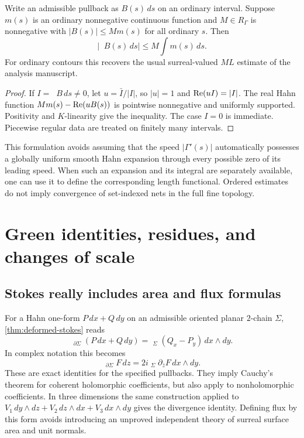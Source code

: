 \documentclass[11pt,letterpaper]{article}
\theoremstyle{definition}
\theoremstyle{remark}
\newcommand{\HInt}{\mathop{\int^{\!H}}\nolimits}\newcommand{\HCoint}{\mathop{\oint^{\!H}}\nolimits}
\numberwithin{equation}{section}
\begin{document}
\begin{proposition}\label{prop:ML}
Write an admissible pullback as $B(s)\,ds$ on an ordinary interval. Suppose $m(s)$ is an ordinary nonnegative continuous function and $M\in R_\Gamma$ is nonnegative with $|B(s)|\le M m(s)$ for all ordinary $s$. Then
\[
 \left|\HInt B(s)\,ds\right|\le M\int m(s)\,ds.
\]
For ordinary contours this recovers the usual surreal-valued $ML$ estimate of the analysis manuscript.
\end{proposition}
\begin{proof}
If $I=\HInt B\,ds\ne0$, let $u=\bar I/|I|$, so $|u|=1$ and $\operatorname{Re}(uI)=|I|$. The real Hahn function $Mm(s)-\operatorname{Re}(uB(s))$ is pointwise nonnegative and uniformly supported. Positivity and $K$-linearity give the inequality. The case $I=0$ is immediate. Piecewise regular data are treated on finitely many intervals.
\end{proof}

This formulation avoids assuming that the speed $|\Gamma'(s)|$ automatically possesses a globally uniform smooth Hahn expansion through every possible zero of its leading speed. When such an expansion and its integral are separately available, one can use it to define the corresponding length functional. Ordered estimates do not imply convergence of set-indexed nets in the full fine topology.

\section{Green identities, residues, and changes of scale}\label{sec:residues}
\subsection{Stokes really includes area and flux formulas}
For a Hahn one-form $P\,dx+Q\,dy$ on an admissible oriented planar $2$-chain $\Sigma$, \cref{thm:deformed-stokes} reads
\begin{equation}\label{eq:green}
 \HInt_{\partial\Sigma}(P\,dx+Q\,dy)
 =\HInt_\Sigma(Q_x-P_y)\,dx\wedge dy.
\end{equation}
In complex notation this becomes
\begin{equation}\label{eq:cauchygreen}
 \HInt_{\partial\Sigma}F\,dz
 =2i\HInt_\Sigma\partial_{\bar z}F\,dx\wedge dy.
\end{equation}
These are exact identities for the specified pullbacks. They imply Cauchy's theorem for coherent holomorphic coefficients, but also apply to nonholomorphic coefficients. In three dimensions the same construction applied to
$V_1\,dy\wedge dz+V_2\,dz\wedge dx+V_3\,dx\wedge dy$
gives the divergence identity. Defining flux by this form avoids introducing an unproved independent theory of surreal surface area and unit normals.
\end{document}
